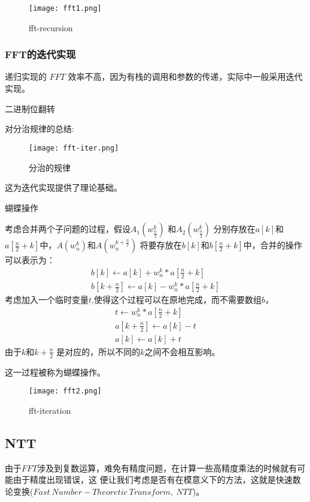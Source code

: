 \begin{figure}[!htbp]
	\centering
	\texttt{[image: fft1.png]}
	\caption{fft-recursion \label{fig:fft1}}
\end{figure}




\subsubsection{FFT的迭代实现}
递归实现的 $FFT$ 效率不高，因为有栈的调用和参数的传递，实际中一般采用迭代实现。

{\heiti 二进制位翻转}

对分治规律的总结:
\begin{figure}[!htbp]
	\centering
	\texttt{[image: fft-iter.png]}
	\caption{分治的规律 \label{fig:fft-pattern}}
\end{figure}
这为迭代实现提供了理论基础。

{\heiti 蝴蝶操作}

考虑合并两个子问题的过程，假设$A_1(w_{\frac{n}{2}}^k)$ 和$A_2(w_{\frac{n}{2}}^k)$ 分别存放在$a[k]$和$a[\frac{n}{2}+k]$中，$A(w_n^k)$和$A(w_n^{k+\frac{n}{2}})$ 将要存放在$b[k]$和$b[\frac{n}{2}+k]$中，合并的操作可以表示为：
\begin{align*}
b[k]\leftarrow  a[k]+w_n^k*a[\frac{n}{2}+k]  \\
b[k+\frac{n}{2}] \leftarrow a[k]-w_n^k*a[\frac{n}{2}+k]
\end{align*}
考虑加入一个临时变量$t$,使得这个过程可以在原地完成，而不需要数组$b$，	
\begin{align*}
t \leftarrow w_n^k*a[\frac{n}{2}+k]   \\
a[k+\frac{n}{2}] \leftarrow a[k]-t  \\
a[k] \leftarrow a[k]+t
\end{align*}
由于$k$和$k+\frac{n}{2}$ 是对应的，所以不同的$k$之间不会相互影响。

这一过程被称为蝴蝶操作。

\begin{figure}[!htbp]
	\centering
	\texttt{[image: fft2.png]}
	\caption{fft-iteration \label{fig:fft2}}
\end{figure}



\subsection{NTT}
由于$FFT$涉及到复数运算，难免有精度问题，在计算一些高精度乘法的时候就有可能由于精度出现错误，这
便让我们考虑是否有在模意义下的方法，这就是{\heiti 快速数论变换}($Fast\ Number-Theoretic\ Transform,\ NTT$)。

